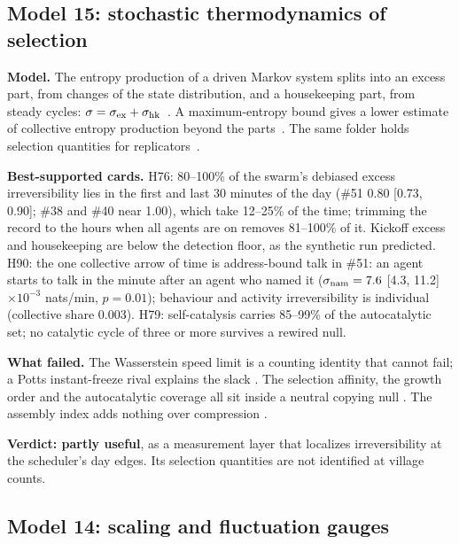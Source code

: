 \subsection{Model 15: stochastic thermodynamics of selection}\label{sec:m15}

\textbf{Model.} The entropy production of a driven Markov system splits into an excess part, from changes of the state distribution, and a housekeeping part, from steady cycles: $\sigma=\sigma_{\rm ex}+\sigma_{\rm hk}$~\cite{kolchinsky2026}. A maximum-entropy bound gives a lower estimate of collective entropy production beyond the parts~\cite{aguilera2026}. The same folder holds selection quantities for replicators~\cite{kolchinsky2025}.

\textbf{Best-supported cards.} H76: 80--100\% of the swarm's debiased excess irreversibility lies in the first and last 30 minutes of the day (\#51 0.80 [0.73, 0.90]; \#38 and \#40 near 1.00), which take 12--25\% of the time; trimming the record to the hours when all agents are on removes 81--100\% of it. Kickoff excess and housekeeping are below the detection floor, as the synthetic run predicted. H90: the one collective arrow of time is address-bound talk in \#51: an agent starts to talk in the minute after an agent who named it ($\sigma_{\rm nam}=7.6$ [4.3, 11.2]$\times10^{-3}$ nats/min, $p=0.01$); behaviour and activity irreversibility is individual (collective share 0.003). H79: self-catalysis carries 85--99\% of the autocatalytic set; no catalytic cycle of three or more survives a rewired null.

\textbf{What failed.} The Wasserstein speed limit is a counting identity that cannot fail; a Potts instant-freeze rival explains the slack . The selection affinity, the growth order and the autocatalytic coverage all sit inside a neutral copying null . The assembly index adds nothing over compression .

\textbf{Verdict: partly useful}, as a measurement layer that localizes irreversibility at the scheduler's day edges. Its selection quantities are not identified at village counts.

\subsection{Model 14: scaling and fluctuation gauges}\label{sec:m14}

